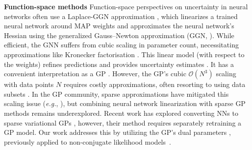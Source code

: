 \documentclass{article} %
\makeatletter
\newcommand{\eg}{\textit{e.g.\@}\xspace}
\makeatother
\begin{document}
\textbf{Function-space methods}
Function-space perspectives on uncertainty in neural networks often use a Laplace-GGN approximation \citep{daxberger2021laplace}, which linearizes a trained neural network around MAP weights and approximates the neural network's Hessian using the generalized Gauss--Newton approximation (GGN, \cite{botev2017practical}).
While efficient, the GNN suffers from cubic scaling in parameter count, necessitating approximations like Kronecker factorisation \cite{martens2015optimizing, ritter2018kfac}. This linear model (with respect to the weights) refines predictions and provides uncertainty estimates \citep{immer2021scalable}. It has a convenient interpretation as a GP \cite{immer2021scalable, khan2019approximate, maddox2021fast}.
%
However, the GP's cubic $\mathcal{O}(N^3)$ scaling with data points $N$ requires costly approximations, often resorting to using data subsets \cite{immer2021scalable}. In the GP community, sparse approximations have mitigated this scaling issue (\eg, \cite{titsias2009variational,hensman2013gaussian}),
but combining neural network linearization with sparse GP methods remains underexplored.
Recent work has explored converting NNs to sparse variational GPs \cite{ortega2023variational}, however, their method requires separately retraining a GP model.
Our work addresses this by utilizing the GP's dual parameters \cite{csato2002sparse}, previously applied to non-conjugate likelihood models~\cite{adam2021dual}.

%
\end{document}
